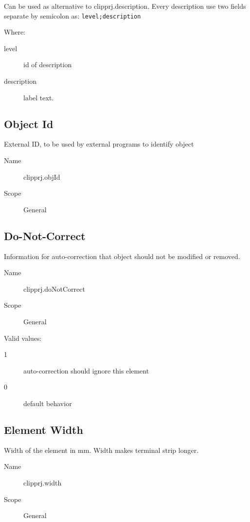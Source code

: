 \documentclass[%
	a4paper,
	oneside,
	listof=numbered,
	parskip=half,
	headsepline=true,
	footsepline=false,
	normalheadings,
	0.7headlines,
	headexclude,
	]{scrbook}
\begin{document}
Can be used as alternative to clipprj.description.
Every description use two fields separate by semicolon as: \verb|level;description|

Where:

\begin{description}
	\item[level] id of description
	\item[description] label text.
\end{description}

\subsection{Object Id}

External ID, to be used by external programs to identify object

\begin{description}
	\item[Name] clipprj.objId
	\item[Scope] General
\end{description}

\subsection{Do-Not-Correct}

Information for auto-correction that object should not be modified or removed.

\begin{description}
	\item[Name] clipprj.doNotCorrect
	\item[Scope] General
\end{description}

Valid values:

\begin{description}
	\item[1] auto-correction should ignore this element
	\item[0] default behavior
\end{description}

\subsection{Element Width}

Width of the element in mm.
Width makes terminal strip longer.\\

\begin{description}
	\item[Name] clipprj.width
	\item[Scope] General
\end{description}
\end{document}
